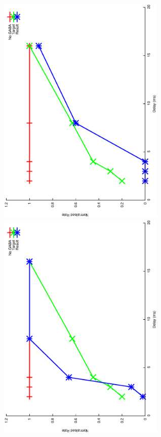 \documentclass{article}
\begin{document}
\includegraphics[keepaspectratio=true,angle=-90,width=0.6\textwidth]{DS_ClickRecovery_result.23.eps}\clearpage
\includegraphics[keepaspectratio=true,angle=-90,width=0.6\textwidth]{DS_ClickRecovery_result.24.eps}\clearpage
\end{document}
